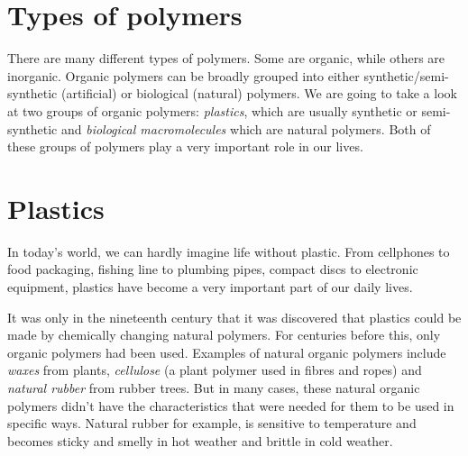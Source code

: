 
\section{Types of polymers}
\label{subsec:orgmac:types}

There are many different types of polymers. Some are organic, while others are inorganic. Organic polymers can be broadly grouped into either synthetic/semi-synthetic (artificial) or biological (natural) polymers. We are going to take a look at two groups of organic polymers: \textit{plastics}, which are usually synthetic or semi-synthetic and \textit{biological macromolecules} which are natural polymers. Both of these groups of polymers play a very important role in our lives.






\section{Plastics}
\label{sec:orgmac:plastics}

In today's world, we can hardly imagine life without plastic. From cellphones to food packaging, fishing line to plumbing pipes, compact discs to electronic equipment, plastics have become a very important part of our daily lives.


It was only in the nineteenth century that it was discovered that plastics could be made by chemically changing natural polymers. For centuries before this, only  organic polymers had been used. Examples of natural organic polymers include \textit{waxes} from plants, \textit{cellulose} (a plant polymer used in fibres and ropes) and \textit{natural rubber} from rubber trees. But in many cases, these natural organic polymers didn't have the characteristics that were needed for them to be used in specific ways. Natural rubber for example, is sensitive to temperature and becomes sticky and smelly in hot weather and brittle in cold weather. \\

